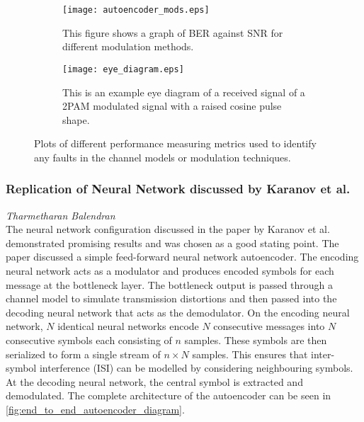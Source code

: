         \begin{figure}[H]
    		\begin{subfigure}{0.5\textwidth}
    			\centering
    			\texttt{[image: autoencoder\_mods.eps]}
    			\caption{This figure shows a graph of BER against SNR for different modulation methods.}
    			\label{fig:ber_vs_snr}	
    		\end{subfigure}
    		\begin{subfigure}{0.5\textwidth}
    			\centering
    			\texttt{[image: eye\_diagram.eps]}
    			\caption{This is an example eye diagram of a received signal of a 2PAM modulated signal with a raised cosine pulse shape.}
    			\label{fig:eye_diagram}	
    		\end{subfigure}
    		\caption{Plots of different performance measuring metrics used to identify any faults in the channel models or modulation techniques.}
    		\label{fig:optical_channel_model_signals}
    	\end{figure}
    
    \subsubsection{Replication of Neural Network discussed by Karanov et al. \autocite{8433895}}
    \label{sec:replication_of_e2e_ae}
    \hspace*{0pt}\hfill \textit{Tharmetharan Balendran}\\
    
        The neural network configuration discussed in the paper by Karanov et al. demonstrated promising results and was chosen as a good stating point. The paper discussed a simple feed-forward neural network autoencoder. The encoding neural network acts as a modulator and produces encoded symbols for each message at the bottleneck layer. The bottleneck output is passed through a channel model to simulate transmission distortions and then passed into the decoding neural network that acts as the demodulator. On the encoding neural network, $N$ identical neural networks encode $N$ consecutive messages into $N$ consecutive symbols each consisting of $n$ samples. These symbols are then serialized to form a single stream of $n\times N$ samples. This ensures that inter-symbol interference (ISI) can be modelled by considering neighbouring symbols. At the decoding neural network, the central symbol is extracted and demodulated. The complete architecture of the autoencoder can be seen in \autoref{fig:end_to_end_autoencoder_diagram}.
        

